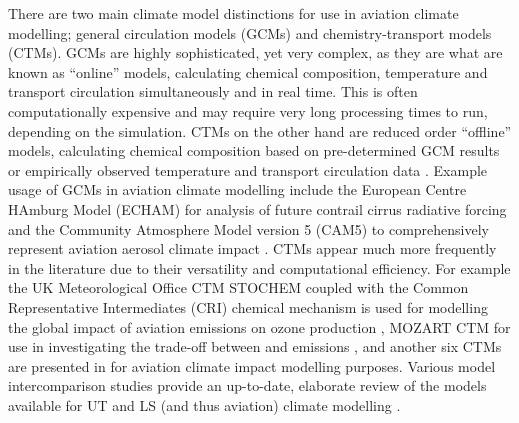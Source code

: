 There are two main climate model distinctions for use in aviation climate modelling; general circulation models (GCMs) and chemistry-transport models (CTMs). GCMs are highly sophisticated, yet very complex, as they are what are known as ``online'' models, calculating chemical composition, temperature and transport circulation simultaneously and in real time. This is often computationally expensive and may require very long processing times to run, depending on the simulation. CTMs on the other hand are reduced order ``offline'' models, calculating chemical composition based on pre-determined GCM results or empirically observed temperature and transport circulation data \cite{IPCC1999}. Example usage of GCMs in aviation climate modelling include the European Centre HAmburg Model (ECHAM) \cite{Stevens2013} for analysis of future contrail cirrus radiative forcing \cite{Bock2019} and the Community Atmosphere Model version 5 (CAM5) \cite{Neale2004} to comprehensively represent aviation aerosol climate impact \cite{Gettelman2013}. CTMs appear much more frequently in the literature due to their versatility and computational efficiency. For example the UK Meteorological Office CTM STOCHEM \cite{Cooke2010} coupled with the Common Representative Intermediates (CRI) chemical mechanism \cite{Jenkin2008} is used for modelling the global impact of aviation  emissions on ozone production \cite{Wasiuk2014}, MOZART CTM \cite{Emmons2010} for use in investigating the trade-off between  and  emissions \cite{Freeman2017}, and another six CTMs are presented in \cite{IPCC1999} for aviation climate impact modelling purposes. Various model intercomparison studies provide an up-to-date, elaborate review of the models available for UT and LS (and thus aviation) climate modelling \cite{Roelofs2003}. 



